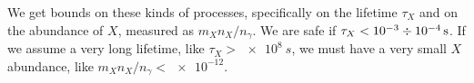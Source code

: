 \documentclass[main.tex]{subfiles}
\begin{document}
We get bounds on these kinds of processes, specifically on the lifetime \(\tau_{X}\) and on the abundance of \(X\), measured as \(m_X n_X / n_\gamma \). 
We are safe if \(\tau_{X} < \num{e-3} \divisionsymbol \SI{e-4}{s}\).
If we assume a very long lifetime, like \(\tau_{X} >    \SI{e8}{s}\), we must have a very small \(X\) abundance, like \(m_X n_X / n_\gamma < \num{e-12}\). 

\end{document}
